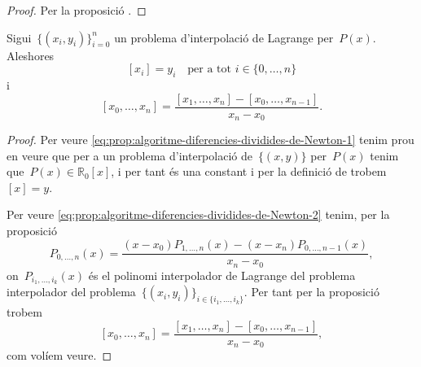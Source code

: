 \documentclass[../../main.tex]{subfiles}
\begin{document}
    \begin{proof}
        Per la proposició .
    \end{proof}
    \begin{proposition}\label{prop:algoritme-diferencies-dividides-de-Newton}
        Sigui~\(\{(x_{i},y_{i})\}_{i=0}^{n}\) un problema d'interpolació de Lagrange per~\(P(x)\).
        Aleshores
        \begin{equation}\label{eq:prop:algoritme-diferencies-dividides-de-Newton-1}
        [x_{i}]=y_{i}\quad\text{per a tot }i\in\{0,\dots,n\}
        \end{equation}
        i
        \begin{equation}\label{eq:prop:algoritme-diferencies-dividides-de-Newton-2}
        [x_{0},\dots,x_{n}]=\frac{[x_{1},\dots,x_{n}]-[x_{0},\dots,x_{n-1}]}{x_{n}-x_{0}}.
        \end{equation}
    \end{proposition}
    \begin{proof}
        Per veure \eqref{eq:prop:algoritme-diferencies-dividides-de-Newton-1} tenim prou en veure que per a un problema d'interpolació de~\(\{(x,y)\}\) per~\(P(x)\) tenim que~\(P(x)\in\mathbb{R}_{0}[x]\), i per tant és una constant i per la definició de  trobem~\([x]=y\).

        Per veure \eqref{eq:prop:algoritme-diferencies-dividides-de-Newton-2} tenim, per la proposició 
        \[
            P_{0,\dots,n}(x)=\frac{\left(x-x_{0}\right)P_{1,\dots,n}(x)-\left(x-x_{n}\right)P_{0,\dots,n-1}(x)}{x_{n}-x_{0}},
        \]
        on~\(P_{i_{1},\dots,i_{k}}(x)\) és el polinomi interpolador de Lagrange del problema interpolador del problema~\(\{(x_{i},y_{i})\}_{i\in\{i_{1},\dots,i_{k}\}}\).
        Per tant per la proposició  trobem %
        \[
            [x_{0},\dots,x_{n}]=\frac{[x_{1},\dots,x_{n}]-[x_{0},\dots,x_{n-1}]}{x_{n}-x_{0}},
        \]
        com volíem veure.
    \end{proof}
\end{document}
